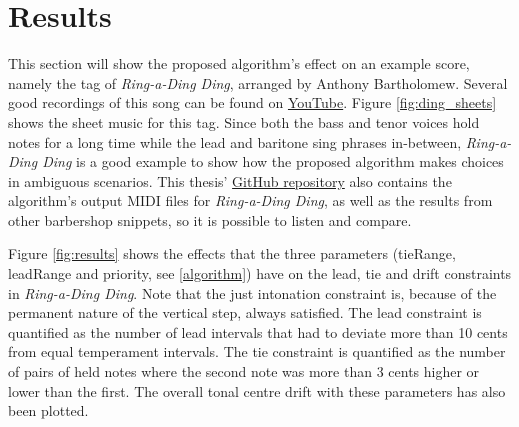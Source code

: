 \documentclass[a4paper]{article}
\begin{document}
\section{Results}
\label{results}

This section will show the proposed algorithm's effect on an example score, namely the tag of \textit{Ring-a-Ding Ding}, arranged by Anthony Bartholomew. Several good recordings of this song can be found on \href{https://www.youtube.com/watch?v=G40I5JDtfjI&t=147s}{YouTube}. Figure \ref{fig:ding_sheets} shows the sheet music for this tag. \cite{dominikschaller_barbershop_2015} Since both the bass and tenor voices hold notes for a long time while the lead and baritone sing phrases in-between, \textit{Ring-a-Ding Ding} is a good example to show how the proposed algorithm makes choices in ambiguous scenarios. This thesis' \href{https://github.com/teuncb/adaptivebarbershop}{GitHub repository} also contains the algorithm's output MIDI files for \textit{Ring-a-Ding Ding}, as well as the results from other barbershop snippets, so it is possible to listen and compare.

Figure \ref{fig:results} shows the effects that the three parameters (tieRange, leadRange and priority, see \ref{algorithm}) have on the lead, tie and drift constraints in \textit{Ring-a-Ding Ding}. Note that the just intonation constraint is, because of the permanent nature of the vertical step, always satisfied. The lead constraint is quantified as the number of lead intervals that had to deviate more than 10 cents from equal temperament intervals. The tie constraint is quantified as the number of pairs of held notes where the second note was more than 3 cents higher or lower than the first. The overall tonal centre drift with these parameters has also been plotted.
\end{document}

